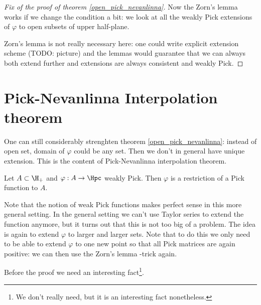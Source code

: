 \begin{proof}[Fix of the proof of theorem \ref{open_pick_nevanlinna}]
Now the Zorn's lemma works if we change the condition a bit: we look at all the weakly Pick extensions of $\varphi$ to open subsets of upper half-plane.

Zorn's lemma is not really necessary here: one could write explicit extension scheme (TODO: picture) and the lemmas would guarantee that we can always both extend further and extensions are always consistent and weakly Pick.
\end{proof}

\section{Pick-Nevanlinna Interpolation theorem}

One can still considerably strenghten theorem \ref{open_pick_nevanlinna}: instead of open set, domain of $\varphi$ could be any set. Then we don't in general have unique extension. This is the content of Pick-Nevanlinna interpolation theorem.

\begin{lause}\label{pick_nevanlinna_interpolation}
	Let $A \subset \H_{+}$ and $\varphi : A \to \Hpc$ weakly Pick. Then $\varphi$ is a restriction of a Pick function to $A$.
\end{lause}

Note that the notion of weak Pick functions makes perfect sense in this more general setting. In the general setting we can't use Taylor series to extend the function anymore, but it turns out that this is not too big of a problem. The idea is again to extend $\varphi$ to larger and larger sets. Note that to do this we only need to be able to extend $\varphi$ to one new point so that all Pick matrices are again positive: we can then use the Zorn's lemma -trick again.

Before the proof we need an interesting fact\footnote{We don't really need, but it is an interesting fact nonetheless.}.

